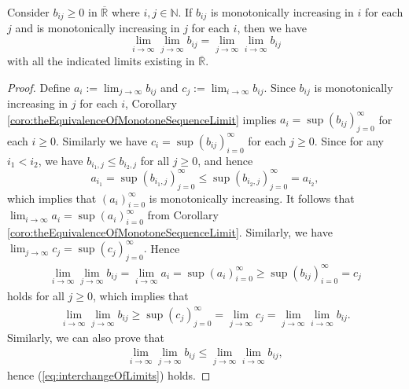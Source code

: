 \begin{thm}
  \label{thm:interchangeOfLimits}
  Consider $b_{ij}\ge 0$ in $\overline{\mathbb{R}}$ where $i,j\in\mathbb{N}$.
  If $b_{ij}$ is monotonically increasing in $i$ for each $j$
  and is monotonically increasing in $j$ for each $i$,
  then we have
  \begin{equation}
    \label{eq:interchangeOfLimits}
    \lim_{i\rightarrow\infty} \lim_{j\rightarrow\infty} b_{ij}
    = \lim_{j\rightarrow\infty} \lim_{i\rightarrow\infty} b_{ij}
  \end{equation}
  with all the indicated limits existing in $\overline{\mathbb{R}}$.
\end{thm}
\begin{proof}
  Define $a_{i}:=\lim_{j\rightarrow\infty}b_{ij}$
  and $c_{j}:=\lim_{i\rightarrow\infty}b_{ij}$. 
  Since $b_{ij}$ is monotonically increasing in $j$ for each $i$,
  Corollary \ref{coro:theEquivalenceOfMonotoneSequenceLimit}
  implies $a_{i}=\sup(b_{ij})_{j=0}^{\infty}$ for each $i\ge 0$.
  Similarly we have $c_{i}=\sup(b_{ij})_{i=0}^{\infty}$ for each $j\ge 0$.
  Since for any $i_{1}<i_{2}$, we have
  $b_{i_{1},j}\le b_{i_{2},j}$ for all $j\ge 0$, and hence
  \begin{displaymath}
    a_{i_{1}}=\sup(b_{i_{1},j})_{j=0}^{\infty}
    \le \sup(b_{i_{2},j})_{j=0}^{\infty} =a_{i_{2}},
  \end{displaymath}
  which implies that
  $(a_{i})_{i=0}^{\infty}$ is monotonically increasing. It follows that
  $\lim_{i\rightarrow\infty}a_{i}=\sup(a_{i})_{i=0}^{\infty}$
  from Corollary \ref{coro:theEquivalenceOfMonotoneSequenceLimit}.
  Similarly, we have
  $\lim_{j\rightarrow\infty}c_{j}=\sup(c_{j})_{j=0}^{\infty}.$
  Hence
  \begin{align*}
    \lim_{i\rightarrow\infty} \lim_{j\rightarrow\infty} b_{ij}
    =\lim_{i\rightarrow\infty} a_{i}
    =\sup(a_{i})_{i=0}^{\infty}
    \ge \sup(b_{ij})_{i=0}^{\infty}
    =c_{j}
  \end{align*}
  holds for all $j\ge 0$, which implies that
  \begin{align*}
    \lim_{i\rightarrow\infty} \lim_{j\rightarrow\infty} b_{ij}
    \ge \sup(c_{j})_{j=0}^{\infty}
    =\lim_{j\rightarrow\infty} c_{j}
    =\lim_{j\rightarrow\infty} \lim_{i\rightarrow\infty} b_{ij}.
  \end{align*}
  Similarly, we can also prove that
  \begin{align*}
    \lim_{i\rightarrow\infty} \lim_{j\rightarrow\infty} b_{ij}
    \le \lim_{j\rightarrow\infty} \lim_{i\rightarrow\infty} b_{ij},
  \end{align*}
  hence (\ref{eq:interchangeOfLimits}) holds.
\end{proof}


